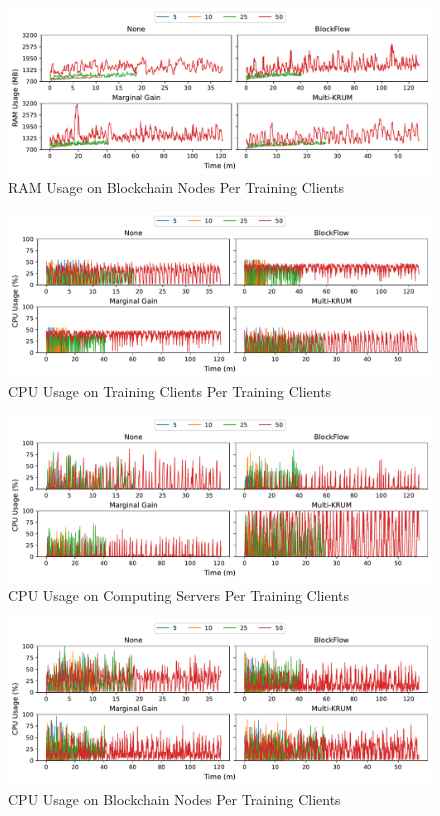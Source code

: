\vfill

\begin{figure}[!h]
    \centering
    \includegraphics[width=\textwidth]{graphics/clients/ram_miner.pdf}
    \caption{RAM Usage on Blockchain Nodes Per Training Clients}
    \label{fig:ram_clients_miners}
\end{figure}

\clearpage

\begin{figure}[!h]
    \centering
    \includegraphics[width=\textwidth]{graphics/clients/cpu_client.pdf}
    \caption{CPU Usage on Training Clients Per Training Clients}
    \label{fig:cpu_clients_clients}
\end{figure}

\vfill

\begin{figure}[!h]
    \centering
    \includegraphics[width=\textwidth]{graphics/clients/cpu_server.pdf}
    \caption{CPU Usage on Computing Servers Per Training Clients}
    \label{fig:cpu_clients_servers}
\end{figure}

\vfill

\begin{figure}[!h]
    \centering
    \includegraphics[width=\textwidth]{graphics/clients/cpu_miner.pdf}
    \caption{CPU Usage on Blockchain Nodes Per Training Clients}
    \label{fig:cpu_clients_miners}
\end{figure}

